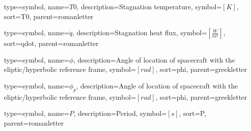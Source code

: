 {
	type=symbol, %
	name={\ensuremath{T0}}, %
	description={Stagnation temperature}, %
	symbol={$\left[K\right]$}, %
	sort=T0, %
	parent=romanletter %
}
	
{
	type=symbol, %
	name={\ensuremath{\dot{q}}}, %
	description={Stagnation heat flux}, %
	symbol={$\left[ \frac{W}{m^2} \right]$}, %
	sort=qdot, %
	parent=romanletter %
}

{
type=symbol, %
name={\ensuremath{\phi}}, %
description={Angle of location of spacecraft with the eliptic/hyperbolic reference frame}, %
symbol={$\left[rad\right]$}, %
sort=phi, %
parent=greekletter %
}

{
type=symbol, %
name={\ensuremath{\phi_p}}, %
description={Angle of location of spacecraft with the eliptic/hyperbolic reference frame}, %
symbol={$\left[rad\right]$}, %
sort=phi, %
parent=greekletter %
}

{
	type=symbol, %
	name={\ensuremath{P}}, %
	description={Period}, %
	symbol={$\left[s\right]$}, %
	sort=P, %
	parent=romanletter %
}



